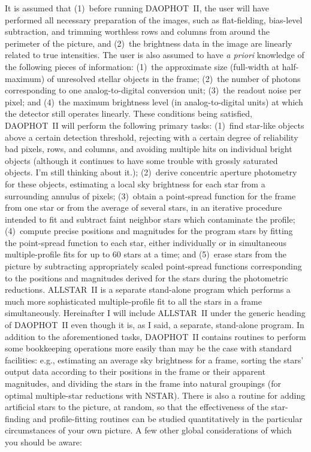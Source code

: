 It is assumed that (1)~before running DAOPHOT~II, the user will have
performed all necessary preparation of the images, such as
flat-fielding, bias-level subtraction, and trimming worthless rows and
columns from around the perimeter of the picture, and (2)~the
brightness data in the image are linearly related to true intensities.
The user is also assumed to have {\it a priori\/} knowledge of the
following pieces of information: (1)~the approximate size (full-width
at half-maximum) of unresolved stellar objects in the frame; (2)~the
number of photons corresponding to one analog-to-digital conversion
unit; (3)~the readout noise per pixel; and (4)~the maximum brightness
level (in analog-to-digital units) at which the detector still operates
linearly. These conditions being satisfied, DAOPHOT~II will perform the
following primary tasks:  (1)~find star-like objects above a certain
detection threshold, rejecting with a certain degree of reliability bad
pixels, rows, and columns, and avoiding multiple hits on individual
bright objects (although it continues to have some trouble with grossly
saturated objects.  I'm still thinking about it.); (2)~derive
concentric aperture photometry for these objects, estimating a local
sky brightness for each star from a surrounding annulus of pixels;
(3)~obtain a point-spread function for the frame from one star or from
the average of several stars, in an iterative procedure intended to fit
and subtract faint neighbor stars which contaminate the profile;
(4)~compute precise positions and magnitudes for the program stars by
fitting the point-spread function to each star, either individually or
in simultaneous multiple-profile fits for up to 60 stars at a time; and
(5)~erase stars from the picture by subtracting appropriately scaled
point-spread functions corresponding to the positions and magnitudes
derived for the stars during the photometric reductions.  ALLSTAR~II is
a separate stand-alone program which performs a much more sophisticated
multiple-profile fit to all the stars in a frame simultaneously.
Hereinafter I will include ALLSTAR~II under the generic heading of
DAOPHOT~II even though it is, as I said, a separate, stand-alone
program.  In addition to the aforementioned tasks, DAOPHOT~II contains
routines to perform some bookkeeping operations more easily than may be
the case with standard facilities: e.g., estimating an average sky
brightness for a frame, sorting the stars' output data according to
their positions in the frame or their apparent magnitudes, and dividing
the stars in the frame into natural groupings (for optimal
multiple-star reductions with NSTAR).  There is also a routine for
adding artificial stars to the picture, at random, so that the
effectiveness of the star-finding and profile-fitting routines can be
studied quantitatively in the particular circumstances of your own
picture. A few other global considerations of which you should be
aware:

